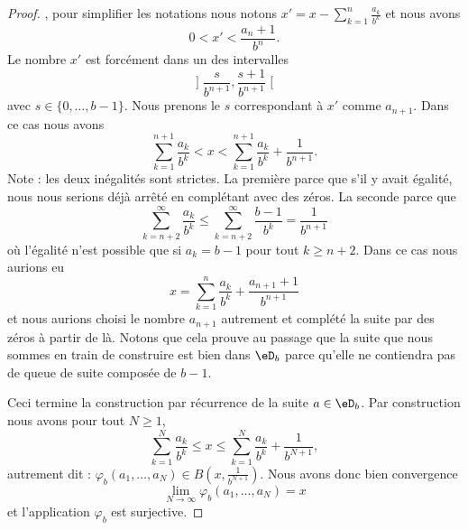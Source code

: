 \begin{proof}
        , pour simplifier les notations nous notons \( x'=x-\sum_{k=1}^{n}\frac{ a_k }{ b^k }\) et nous avons
        \begin{equation}
            0<x'<\frac{ a_n+1 }{ b^n }.
        \end{equation}
        Le nombre \( x'\) est forcément dans un des intervalles
        \begin{equation}
                \mathopen] \frac{ s }{ b^{n+1} } , \frac{ s+1 }{ b^{n+1} } \mathclose[
        \end{equation}
        avec \( s\in\{ 0,\ldots, b-1 \}\). Nous prenons le \( s\) correspondant à \( x'\) comme \( a_{n+1}\). Dans ce cas nous avons
        \begin{equation}
            \sum_{k=1}^{n+1}\frac{ a_k }{ b^k }< x<\sum_{k=1}^{n+1}\frac{ a_k }{ b^k }+\frac{1}{ b^{n+1} }.
        \end{equation}
        Note : les deux inégalités sont strictes. La première parce que s'il y avait égalité, nous nous serions déjà arrêté en complétant avec des zéros. La seconde parce que 
        \begin{equation}
            \sum_{k=n+2}^{\infty}\frac{ a_k }{ b^k }\leq \sum_{k=n+2}^{\infty}\frac{ b-1 }{ b^k }=\frac{1}{ b^{n+1} }
        \end{equation}
        où l'égalité n'est possible que si \( a_k=b-1\) pour tout \( k\geq n+2\). Dans ce cas nous aurions eu
        \begin{equation}
            x=\sum_{k=1}^{n}\frac{ a_k }{ b^k }+\frac{ a_{n+1}+1 }{ b^{n+1} }
        \end{equation}
        et nous aurions choisi le nombre \( a_{n+1}\) autrement et complété la suite par des zéros à partir de là. Notons que cela prouve au passage que la suite que nous sommes en train de construire est bien dans \( \eD_b\) parce qu'elle ne contiendra pas de queue de suite composée de \( b-1\).

        Ceci termine la construction par récurrence de la suite \( a\in \eD_b\). Par construction nous avons pour tout \( N\geq 1\),
        \begin{equation}
            \sum_{k=1}^N\frac{ a_k }{ b^k }\leq x\leq \sum_{k=1}^N\frac{ a_k }{ b^k }+\frac{1}{ b^{N+1} }, 
        \end{equation}
        autrement dit : \( \varphi_b(a_1,\ldots, a_N)\in B(x,\frac{1}{ b^{N+1} })\). Nous avons donc bien convergence
        \begin{equation}
            \lim_{N\to \infty} \varphi_b(a_1,\ldots, a_N)=x
        \end{equation}
        et l'application \( \varphi_b\) est surjective.
\end{proof}

